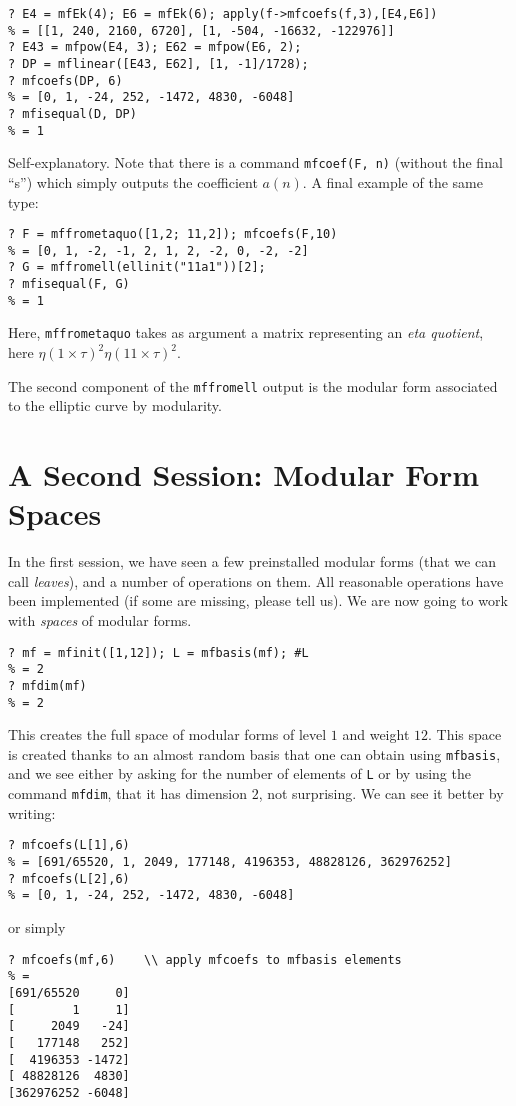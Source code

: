 \documentclass[11pt]{article}
\def\kbd#1{{\tt #1}}
\begin{document}
\begin{verbatim}
? E4 = mfEk(4); E6 = mfEk(6); apply(f->mfcoefs(f,3),[E4,E6])
% = [[1, 240, 2160, 6720], [1, -504, -16632, -122976]]
? E43 = mfpow(E4, 3); E62 = mfpow(E6, 2);
? DP = mflinear([E43, E62], [1, -1]/1728);
? mfcoefs(DP, 6)
% = [0, 1, -24, 252, -1472, 4830, -6048]
? mfisequal(D, DP)
% = 1
\end{verbatim}

Self-explanatory. Note that there is a command \kbd{mfcoef(F, n)} (without
the final ``s'') which simply outputs the coefficient $a(n)$.
A final example of the same type:

\begin{verbatim}
? F = mffrometaquo([1,2; 11,2]); mfcoefs(F,10)
% = [0, 1, -2, -1, 2, 1, 2, -2, 0, -2, -2]
? G = mffromell(ellinit("11a1"))[2];
? mfisequal(F, G)
% = 1
\end{verbatim}

Here, \kbd{mffrometaquo} takes as argument a matrix representing an
\emph{eta quotient}, here $\eta(1\times\tau)^2\eta(11\times\tau)^2$.

The second component of the \kbd{mffromell} output is the modular form
associated to the elliptic curve by modularity.

\section{A Second Session: Modular Form Spaces}

In the first session, we have seen a few preinstalled modular forms (that
we can call \emph{leaves}), and a number of operations on them. All reasonable
operations have been implemented (if some are missing, please tell us). We are
now going to work with \emph{spaces} of modular forms.

\begin{verbatim}
? mf = mfinit([1,12]); L = mfbasis(mf); #L
% = 2
? mfdim(mf)
% = 2
\end{verbatim}

This creates the full space of modular forms of level $1$ and weight $12$.
This space is created thanks to an almost random basis that one can obtain
using \kbd{mfbasis}, and we see either by asking for the number of elements
of \kbd{L} or by using the command \kbd{mfdim}, that it has dimension $2$,
not surprising. We can see it better by writing:

\begin{verbatim}
? mfcoefs(L[1],6)
% = [691/65520, 1, 2049, 177148, 4196353, 48828126, 362976252]
? mfcoefs(L[2],6)
% = [0, 1, -24, 252, -1472, 4830, -6048]
\end{verbatim}
or simply
\begin{verbatim}
? mfcoefs(mf,6)    \\ apply mfcoefs to mfbasis elements
% =
[691/65520     0]
[        1     1]
[     2049   -24]
[   177148   252]
[  4196353 -1472]
[ 48828126  4830]
[362976252 -6048]
\end{verbatim}
\end{document}
